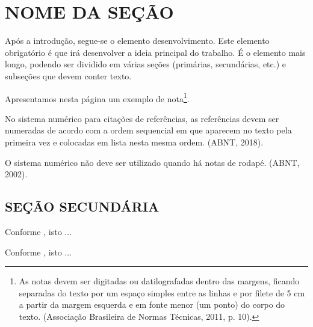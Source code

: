 \documentclass[
  oneside, %
  english,
  brazil
]{abntbibufjf}
\begin{document}
\chapter{NOME DA SEÇÃO}

Após a introdução, segue-se o elemento desenvolvimento.
Este elemento obrigatório é que irá desenvolver a ideia principal do trabalho.
É o elemento mais longo, podendo ser dividido em várias seções (primárias, secundárias, etc.) e subseções que devem conter texto.

Apresentamos nesta página um exemplo de nota\footnote{\noindent
  As notas devem ser digitadas ou datilografadas dentro das margens, ficando separadas do texto por um espaço simples entre as linhas e por filete de 5 cm a partir da margem esquerda e em fonte menor (um ponto) do corpo do texto.
  (Associação Brasileira de Normas Técnicas, 2011, p. 10).
}.

No sistema numérico para citações de referências, as referências devem ser numeradas de acordo com a ordem sequencial em que aparecem no texto pela primeira vez e colocadas em lista nesta mesma ordem. (ABNT, 2018).

O sistema numérico não deve ser utilizado quando há notas de rodapé. (ABNT, 2002).


\section{SEÇÃO SECUNDÁRIA}



Conforme \citep[p. 4]{t1}, isto ...

Conforme \citet*[p. 4]{t1}, isto ...
\end{document}
